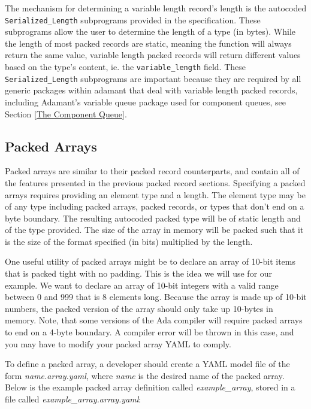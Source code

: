 The mechanism for determining a variable length record's length is the autocoded \texttt{Serialized\_Length} subprograms provided in the specification. These subprograms allow the user to determine the length of a type (in bytes). While the length of most packed records are static, meaning the function will always return the same value, variable length packed records will return different values based on the type's content, ie. the \texttt{variable\_length} field. These \texttt{Serialized\_Length} subprograms are important because they are required by all generic packages within adamant that deal with variable length packed records, including Adamant's variable queue package used for component queues, see Section \ref{The Component Queue}.

\subsection{Packed Arrays}

Packed arrays are similar to their packed record counterparts, and contain all of the features presented in the previous packed record sections. Specifying a packed arrays requires providing an element type and a length. The element type may be of any type including packed arrays, packed records, or types that don't end on a byte boundary. The resulting autocoded packed type will be of static length and of the type provided. The size of the array in memory will be packed such that it is the size of the format specified (in bits) multiplied by the length.

One useful utility of packed arrays might be to declare an array of 10-bit items that is packed tight with no padding. This is the idea we will use for our example. We want to declare an array of 10-bit integers with a valid range between 0 and 999 that is 8 elements long. Because the array is made up of 10-bit numbers, the packed version of the array should only take up 10-bytes in memory. Note, that some versions of the Ada compiler will require packed arrays to end on a 4-byte boundary. A compiler error will be thrown in this case, and you may have to modify your packed array YAML to comply.

To define a packed array, a developer should create a YAML model file of the form \textit{name.array.yaml}, where \textit{name} is the desired name of the packed array. Below is the example packed array definition called \textit{example\_array}, stored in a file called \textit{example\_array.array.yaml}:

